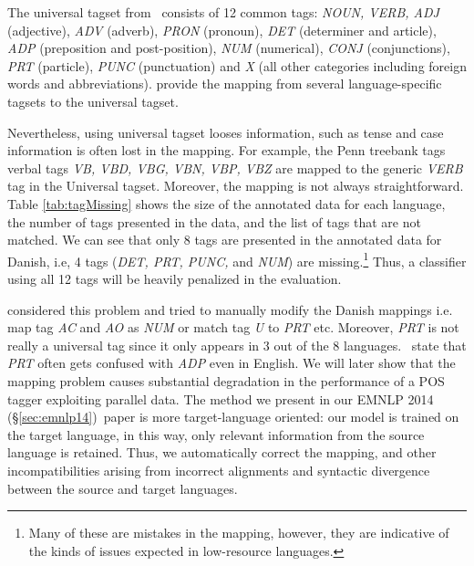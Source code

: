 \documentclass[12pt,twoside,final,hidelinks]{ltthesis}
\theoremstyle{definition}
\newcommand\emnlpiv{EMNLP 2014 (\S\ref{sec:emnlp14})}
\begin{document}
The universal tagset from~ consists of 12 common tags: \textit{NOUN, VERB, ADJ} (adjective), \textit{ADV} (adverb), \textit{PRON} (pronoun), \textit{DET} (determiner and article), \textit{ADP} (preposition and post-position), \textit{NUM} (numerical), \textit{CONJ} (conjunctions), \textit{PRT} (particle), \textit{PUNC} (punctuation) and \textit{X} (all other categories including foreign words and abbreviations).  provide the mapping from several language-specific tagsets to the universal tagset.

Nevertheless, using universal tagset looses information, such as tense and case information is often lost in the mapping. For example, the Penn treebank tags verbal tags \textit{VB, VBD, VBG, VBN, VBP, VBZ} are mapped to the generic \textit{VERB} tag in the Universal tagset. Moreover, the mapping is not always straightforward. Table \ref{tab:tagMissing} shows the size of the annotated data for each language, the number of tags presented in the data, and the list of tags that are not matched. We can see that only 8 tags are presented in the annotated data for Danish, i.e, 4 tags (\textit{DET, PRT, PUNC,} and \textit{NUM}) are missing.\footnote{Many of these are mistakes in the mapping, however, they are indicative of the kinds of issues expected in low-resource languages.}
Thus, a classifier using all 12 tags will be heavily penalized in the evaluation.

 considered this problem and tried to manually modify the Danish mappings i.e. map tag \textit{AC} and \textit{AO} as \textit{NUM} or match tag \textit{U} to \textit{PRT} etc. Moreover, \textit{PRT} is not really a universal tag since it only appears in 3 out of the 8 languages.~ state that \textit{PRT} often gets confused with \textit{ADP} even in English. We will later show that the mapping problem causes substantial degradation in the performance of a POS tagger exploiting parallel data. The method we present in our \emnlpiv\ paper is more target-language oriented: our model is trained on the target language, in this way, only relevant information from the source language is retained. Thus, we automatically correct the mapping, and other incompatibilities arising from incorrect alignments and syntactic divergence between the source and target languages. 
 
\end{document}
